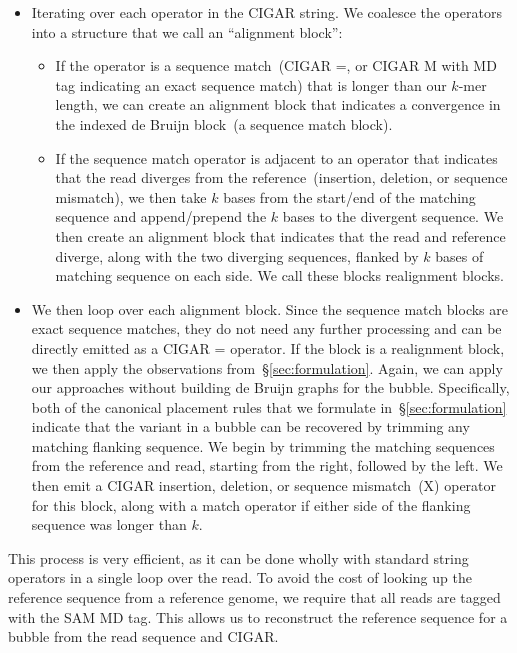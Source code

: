 \documentclass[phd]{ucbthesis}
\begin{document}
\begin{itemize}
\item Iterating over each operator in the CIGAR string. We coalesce the operators
into a structure that we call an ``alignment block'':
\begin{itemize}
\item If the operator is a sequence match~(CIGAR \textsc{=}, or CIGAR \textsc{M}
with MD tag indicating an exact sequence match) that is longer than our $k$-mer
length, we can create an alignment block that indicates a convergence in the
indexed de Bruijn block~(a sequence match block).
\item If the sequence match operator is adjacent to an operator that indicates
that the read diverges from the reference~(insertion, deletion, or sequence
mismatch), we then take $k$ bases from the start/end of the matching sequence
and append/prepend the $k$ bases to the divergent sequence. We then create an
alignment block that indicates that the read and reference diverge, along with
the two diverging sequences, flanked by $k$ bases of matching sequence on
each side. We call these blocks realignment blocks.
\end{itemize}
\item We then loop over each alignment block. Since the sequence match blocks
are exact sequence matches, they do not need any further processing and can be
directly emitted as a CIGAR \textsc{=} operator. If the block is a realignment
block, we then apply the observations from~\S\ref{sec:formulation}. Again, we
can apply our approaches without building de Bruijn graphs for the bubble.
Specifically, both of the canonical placement rules that we formulate
in~\S\ref{sec:formulation} indicate that the variant in a bubble can be recovered
by trimming any matching flanking sequence. We begin by trimming the matching
sequences from the reference and read, starting from the right, followed
by the left. We then emit a CIGAR insertion, deletion, or sequence
mismatch~(\textsc{X}) operator for this block, along with a match operator if
either side of the flanking sequence was longer than $k$.
\end{itemize}

This process is very efficient, as it can be done wholly with standard string
operators in a single loop over the read. To avoid the cost of looking up the
reference sequence from a reference genome, we require that all reads are
tagged with the SAM \textsc{MD} tag. This allows us to reconstruct the
reference sequence for a bubble from the read sequence and CIGAR.
\end{document}
